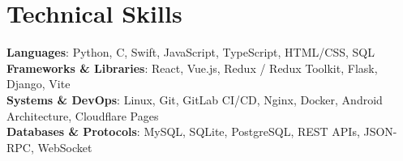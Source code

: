 \documentclass[letterpaper,10pt]{article}
\begin{document}
\section{Technical Skills}
 \begin{itemize}[leftmargin=0.15in, label={}]
    \small{\item{
     \textbf{Languages}{: Python, C, Swift, JavaScript, TypeScript, HTML/CSS, SQL} \\
     \textbf{Frameworks \& Libraries}{: React, Vue.js, Redux / Redux Toolkit, Flask, Django, Vite} \\
     \textbf{Systems \& DevOps}{: Linux, Git, GitLab CI/CD, Nginx, Docker, Android Architecture, Cloudflare Pages} \\
     \textbf{Databases \& Protocols}{: MySQL, SQLite, PostgreSQL, REST APIs, JSON-RPC, WebSocket} \\
    }}
 \end{itemize}
\end{document}
